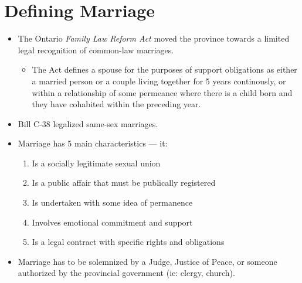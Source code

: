\documentclass{article}
\begin{document}
\section{Defining Marriage}
\begin{itemize}
    \item The Ontario \emph{Family Law Reform Act} moved the province towards a limited legal recognition of common-law marriages.
        \begin{itemize}
            \item The Act defines a spouse for the purposes of support obligations as either a married person or a couple living together for 5 years continously, or within a relationship of some permeance where there is a child born and they have cohabited within the preceding year.
        \end{itemize}
    \item Bill C-38 legalized same-sex marriages.
    \item Marriage has 5 main characteristics --- it:
        \begin{enumerate}
            \item Is a socially legitimate sexual union
            \item Is a public affair that must be publically registered
            \item Is undertaken with some idea of permanence
            \item Involves emotional commitment and support
            \item Is a legal contract with specific rights and obligations
        \end{enumerate}
    \item Marriage has to be solemnized by a Judge, Justice of Peace, or someone authorized by the provincial government (ie: clergy, church).
\end{itemize}
\end{document}
